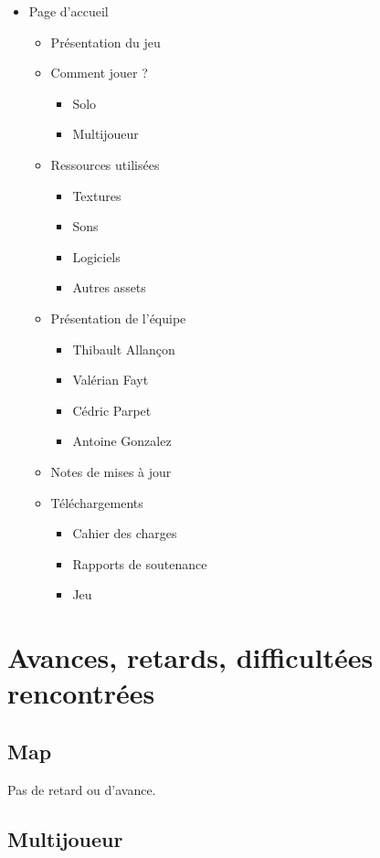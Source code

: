 \documentclass[12pt]{report}
\begin{document}
\begin{itemize}
	\item Page d'accueil
	\begin{itemize}
	\item Présentation du jeu
	\item Comment jouer ?
		\begin{itemize}
		\item Solo
		\item Multijoueur
		\end{itemize}
	\item Ressources utilisées
		\begin{itemize}
		\item Textures
		\item Sons
		\item Logiciels
		\item Autres assets
		\end{itemize}
	\item Présentation de l'équipe
		\begin{itemize}
		\item Thibault Allançon
		\item Valérian Fayt
		\item Cédric Parpet
		\item Antoine Gonzalez
		\end{itemize}
	\item Notes de mises à jour
	\item Téléchargements
		\begin{itemize}
		\item Cahier des charges
		\item Rapports de soutenance
		\item Jeu
		\end{itemize}
	\end{itemize}
\end{itemize}


\chapter{Avances, retards, difficultées rencontrées}

\section*{Map}

Pas de retard ou d'avance.

\section*{Multijoueur}
\end{document}
